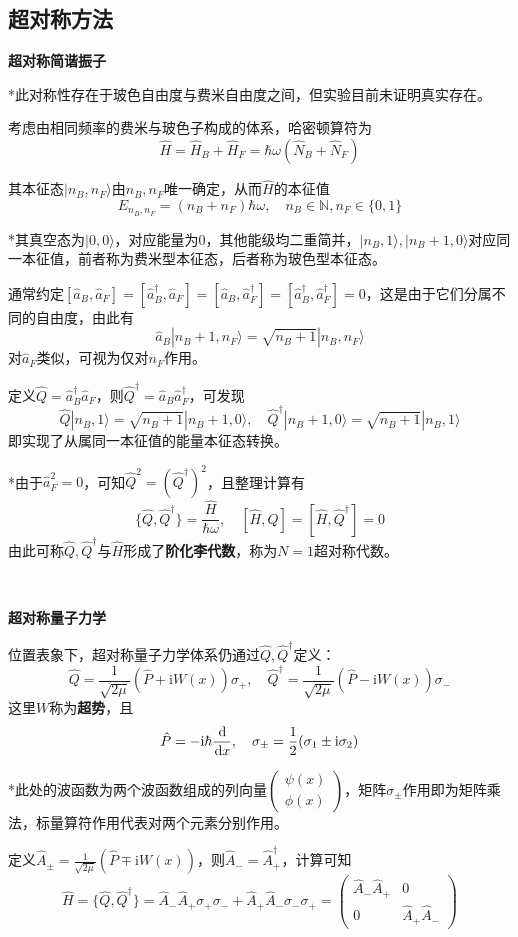 \documentclass[a4paper,UTF8,fontset=windows]{ctexart}
\newcommand*{\dr}{\hspace{0.07em}\mathrm{d}}
\newcommand*{\ir}{\mathrm{i}}
\newcommand*{\ket}[1]{|#1\rangle}
\begin{document}
\subsection{超对称方法}
\textbf{超对称简谐振子}

*此对称性存在于玻色自由度与费米自由度之间，但实验目前未证明真实存在。

考虑由相同频率的费米与玻色子构成的体系，哈密顿算符为
$$\hat{H}=\hat{H}_B+\hat{H}_F=\hbar\omega(\hat{N}_B+\hat{N}_F)$$

其本征态$\ket{n_B,n_F}$由$n_B,n_F$唯一确定，从而$\hat{H}$的本征值
$$E_{n_B,n_F}=(n_B+n_F)\hbar\omega,\quad n_B\in\mathbb{N},n_F\in\{0,1\}$$

*其真空态为$\ket{0,0}$，对应能量为0，其他能级均二重简并，$\ket{n_B,1},\ket{n_B+1,0}$对应同一本征值，前者称为费米型本征态，后者称为玻色型本征态。

通常约定$[\hat{a}_B,\hat{a}_F]=[\hat{a}_B^\dagger,\hat{a}_F]=[\hat{a}_B,\hat{a}_F^\dagger]=[\hat{a}_B^\dagger,\hat{a}_F^\dagger]=0$，这是由于它们分属不同的自由度，由此有
$$\hat{a}_B\ket{n_B+1,n_F}=\sqrt{n_B+1}\ket{n_B,n_F}$$
对$\hat{a}_F$类似，可视为仅对$n_F$作用。

定义$\hat{Q}=\hat{a}_B^\dagger\hat{a}_F$，则$\hat{Q}^\dagger=\hat{a}_B\hat{a}_F^\dagger$，可发现
$$\hat{Q}\ket{n_B,1}=\sqrt{n_B+1}\ket{n_B+1,0},\quad\hat{Q}^\dagger\ket{n_B+1,0}=\sqrt{n_B+1}\ket{n_B,1}$$
即实现了从属同一本征值的能量本征态转换。

*由于$\hat{a}_F^2=0$，可知$\hat{Q}^2=(\hat{Q}^\dagger)^2$，且整理计算有
$$\{\hat{Q},\hat{Q}^\dagger\}=\frac{\hat{H}}{\hbar\omega},\quad[\hat{H},\hat{Q}]=[\hat{H},\hat{Q}^\dagger]=0$$
由此可称$\hat{Q},\hat{Q}^\dagger$与$\hat{H}$形成了\textbf{阶化李代数}，称为$N=1$超对称代数。

\

\textbf{超对称量子力学}

位置表象下，超对称量子力学体系仍通过$\hat{Q},\hat{Q}^\dagger$定义：
$$\hat{Q}=\frac{1}{\sqrt{2\mu}}(\hat{P}+\ir W(x))\sigma_+,\quad\hat{Q}^\dagger=\frac{1}{\sqrt{2\mu}}(\hat{P}-\ir W(x))\sigma_-$$
这里$W$称为\textbf{超势}，且
$$\hat{P}=-\ir\hbar\frac{\dr}{\dr x},\quad\sigma_{\pm}=\frac{1}{2}(\sigma_1\pm\ir\sigma_2)$$

*此处的波函数为两个波函数组成的列向量$\begin{pmatrix}\psi(x)\\\phi(x)\end{pmatrix}$，矩阵$\sigma_\pm$作用即为矩阵乘法，标量算符作用代表对两个元素分别作用。

定义$\hat{A}_\pm=\frac{1}{\sqrt{2\mu}}(\hat{P}\mp\ir W(x))$，则$\hat{A}_-=\hat{A}_+^\dagger$，计算可知
$$\hat{H}=\{\hat{Q},\hat{Q}^\dagger\}=\hat{A}_-\hat{A}_+\sigma_+\sigma_-+\hat{A}_+\hat{A}_-\sigma_-\sigma_+=\begin{pmatrix}\hat{A}_-\hat{A}_+&0\\0&\hat{A}_+\hat{A}_-\end{pmatrix}$$
\end{document}
